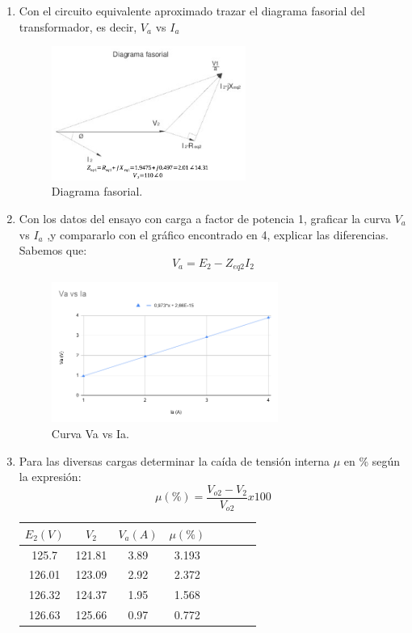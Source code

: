 \documentclass[12pt]{article}
\begin{document}
\begin{enumerate}
    \item Con el circuito equivalente aproximado trazar el diagrama fasorial del transformador, es decir, $V_{a}$ vs $I_{a}$
    \begin{figure}[H]
    \centering
    \includegraphics[width=0.6\textwidth]{fasorial.png}
    \captionsetup{labelformat=empty}
    \caption{\label{pi} Diagrama fasorial.}
    \end{figure}
    
    \item Con los datos del ensayo con carga a factor de potencia 1, graficar la curva $V_{a}$ vs $I_{a}$ ,y compararlo con el gráfico encontrado en 4, explicar las diferencias.
    Sabemos que:
    \[V_{a}=E_{2}−Z_{eq2}I_{2}\]
    \begin{figure}[H]
    \centering
    \includegraphics[width=0.7\textwidth]{VavsIa.png}
    \captionsetup{labelformat=empty}
    \caption{\label{pi} Curva Va vs Ia.}
    \end{figure}
    
    \item Para las diversas cargas determinar la caída de tensión interna $\mu$ en \% según la expresión:
    \[\mu(\%)=\frac{V_{o2}-V_{2}}{V_{o2}}x100\]
    \begin{center}
        \begin{tabular}{ |c|c|c|c|c|c|c|c| } 
            \hline
            $E_{2}(V)$ & $V_{2}$ & $V_{a}(A)$ & $\mu(\%)$ \\
            \hline
            125.7 & 121.81 & 3.89 & 3.193\\
            126.01 & 123.09 & 2.92 & 2.372\\
            126.32 & 124.37 & 1.95 & 1.568\\
            126.63 & 125.66 & 0.97 & 0.772\\
            \hline
        \end{tabular}
    \end{center}
    

\end{enumerate}
\end{document}
